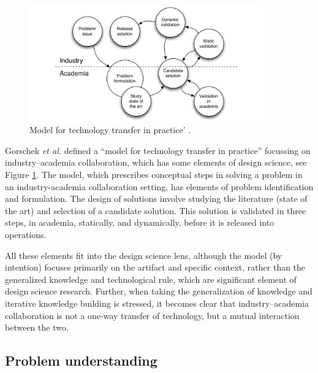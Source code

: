 \documentclass[graybox]{svmult}
\begin{document}
\begin{figure}
  \includegraphics[width=0.9\textwidth]{Figures/GorschekModel.pdf}
\caption{Model for technology transfer in practice' \cite{GorschekSW2006}.}
\label{fig:GorschekModel}       %
\end{figure}

Gorschek \emph{et al.} defined a ``model for technology transfer in practice'' \cite{GorschekSW2006} focussing on industry--academia collaboration, which has some elements of design science, see Figure \ref{fig:GorschekModel}. The model, which prescribes conceptual steps in solving a problem in an industry-academia collaboration setting, has elements of problem identification and formulation. The design of solutions involve studying the literature (state of the art) and selection of a candidate solution. This solution is validated in three steps, in academia, statically, and dynamically, before it is released into operations. 

All these elements fit into the design science lens, although the model (by intention) focuses primarily on the artifact and specific context, rather than the generalized knowledge and technological rule, which are significant element of design science research. Further, when taking the generalization of knowledge and iterative knowledge building is stressed, it becomes clear that industry--academia collaboration is not a one-way transfer of technology, but a mutual interaction between the two.



\subsection{Problem understanding}



\end{document}
